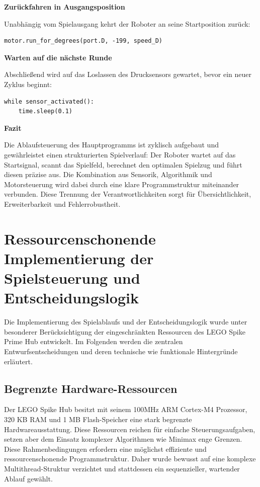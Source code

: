\textbf{Zurückfahren in Ausgangsposition}

Unabhängig vom Spielausgang kehrt der Roboter an seine Startposition zurück:

\begin{lstlisting}[style=pythonstyle]
	motor.run_for_degrees(port.D, -199, speed_D)
\end{lstlisting}

\textbf{Warten auf die nächste Runde}

Abschließend wird auf das Loslassen des Drucksensors gewartet, bevor ein neuer Zyklus beginnt:

\begin{lstlisting}[style=pythonstyle]
	while sensor_activated():
	time.sleep(0.1)
\end{lstlisting}

\textbf{Fazit}

Die Ablaufsteuerung des Hauptprogramms ist zyklisch aufgebaut und gewährleistet einen strukturierten Spielverlauf: Der Roboter wartet auf das Startsignal, scannt das Spielfeld, berechnet den optimalen Spielzug und führt diesen präzise aus. Die Kombination aus Sensorik, Algorithmik und Motorsteuerung wird dabei durch eine klare Programmstruktur miteinander verbunden. Diese Trennung der Verantwortlichkeiten sorgt für Übersichtlichkeit, Erweiterbarkeit und Fehlerrobustheit.

\section{Ressourcenschonende Implementierung der Spielsteuerung und Entscheidungslogik}

Die Implementierung des Spielablaufs und der Entscheidungslogik wurde unter besonderer Berücksichtigung der eingeschränkten Ressourcen des LEGO Spike Prime Hub entwickelt. Im Folgenden werden die zentralen Entwurfsentscheidungen und deren technische wie funktionale Hintergründe erläutert.

\subsection{Begrenzte Hardware-Ressourcen}
Der LEGO Spike Hub besitzt mit seinem 100MHz ARM Cortex-M4 Prozessor, 320 KB RAM und 1 MB Flash-Speicher eine stark begrenzte Hardwareausstattung. Diese Ressourcen reichen für einfache Steuerungsaufgaben, setzen aber dem Einsatz komplexer Algorithmen wie Minimax enge Grenzen.
Diese Rahmenbedingungen erfordern eine möglichst effiziente und ressourcenschonende Programmstruktur. Daher wurde bewusst auf eine komplexe Multithread-Struktur verzichtet und stattdessen ein sequenzieller, wartender Ablauf gewählt.

